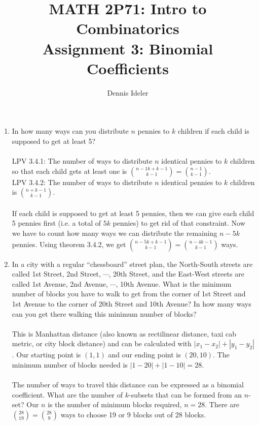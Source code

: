 \documentclass[10pt,a4paper,final]{article}
\author{Dennis Ideler}
\title{MATH 2P71: Intro to Combinatorics\\Assignment 3: Binomial Coefficients}
\begin{document}
\maketitle

\begin{enumerate}
\item %
In how many ways can you distribute $n$ pennies to $k$ children
if each child is supposed to get at least 5?\\
\\
LPV 3.4.1: The number of ways to distribute $n$ identical pennies to $k$ children so that each child gets at least
one is $\binom{n-1k+k-1}{k-1} = \binom{n-1}{k-1}$.\\
LPV 3.4.2: The number of ways to distribute $n$ identical pennies to $k$ children is $\binom{n+k-1}{k-1}$.\\
\\
If each child is supposed to get at least 5 pennies, then we can give each child 5 pennies
first (i.e. a total of $5k$ pennies) to get rid of that constraint.
Now we have to count how many ways we can distribute the remaining $n-5k$ pennies.
Using theorem 3.4.2, we get $\binom{n-5k+k-1}{k-1} = \binom{n-4k-1}{k-1}$ ways.

\item %
In a city with a regular ``chessboard'' street plan, the North-South streets are called 1st Street, 2nd
Street, $\cdots$, 20th Street, and the East-West streets are called 1st Avenue, 2nd Avenue, $\cdots$,
10th Avenue. What is the minimum number of blocks you have to walk to get from the corner of 1st Street
and 1st Avenue to the corner of 20th Street and 10th Avenue? In how many ways can you get there
walking this minimum number of blocks?\\
\\
This is Manhattan distance (also known as rectilinear distance, taxi cab metric, or city block distance)
and can be calculated with $\left|x_1-x_2\right| + \left|y_1-y_2\right|$.
Our starting point is $(1,1)$ and our ending point is $(20,10)$.
The minimum number of blocks needed is $\left|1-20\right| + \left|1-10\right| = 28$.\\
\\
The number of ways to travel this distance can be expressed as a binomial coefficient.
What are the number of $k$-subsets that can be formed from an $n$-set?
Our $n$ is the number of minimum blocks required, $n = 28$.
There are $\binom{28}{19} = \binom{28}{9}$ ways to choose 19 or 9 blocks out of 28 blocks.


\end{enumerate}
\end{document}
